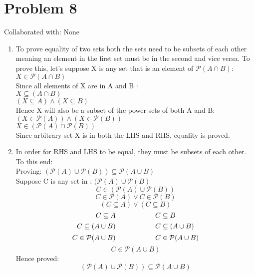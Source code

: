 \documentclass{article}
\begin{document}
\section{Problem 8}
Collaborated with: None
\begin{enumerate}
\item %
To prove equality of two sets both the sets need to be subsets of each other meaning an element in the first set must be in the second and vice versa. To prove this, let's suppose X is any set that is an element of $\mathcal{P}(A \cap B)$: \\
$  X \in \mathcal{P}(A \cap B)   $\\
Since all elements of X are in A and B :\\
$ X \subseteq (A \cap B)    $\\
$ (X \subseteq A) \wedge (X \subseteq B)    $\\
Hence X will also be a subset of the power sets of both A and B: \\
$    (X \in \mathcal{P}(A)) \wedge  (X \in \mathcal{P}(B)) $\\
$   X \in (\mathcal{P}(A) \cap \mathcal{P}(B))  $\\
Since arbitrary set X is in both the LHS and RHS, equality is proved. \\
\item %
In order for RHS and LHS to be equal, they must be subsets of each other. To this end:\\
Proving: $(\mathcal{P}(A) \cup \mathcal{P}(B)) \subseteq \mathcal{P}(A \cup B)$\\
Suppose C is any set in : $(\mathcal{P}(A) \cup \mathcal{P}(B)$
$$ C \in (\mathcal{P}(A) \cup \mathcal{P}(B))$$
$$C \in \mathcal{P}(A) \vee C \in \mathcal{P}(B)$$
$$ (C \subseteq A) \vee (C \subseteq B) $$
$$ C \subseteq A\hspace{20mm} C \subseteq B $$ 
$$ C \subseteq (A \cup B) \hspace{20mm} C \subseteq (A \cup B) $$
$$ C \in \mathcal{P}(A \cup B) \hspace{20mm} C \in \mathcal{P}(A \cup B) $$
$$C \in \mathcal{P}(A \cup B)$$
Hence proved: $$ (\mathcal{P}(A) \cup \mathcal{P}(B)) \subseteq \mathcal{P}(A \cup B)$$


\end{enumerate}
\end{document}
